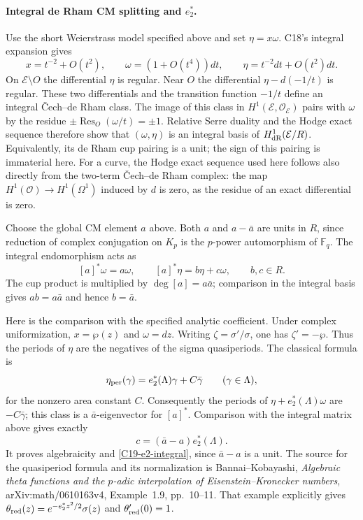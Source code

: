 \documentclass[11pt]{article}
\theoremstyle{definition}\newtheorem{definition}[theorem]{Definition}\newtheorem{remark}[theorem]{Remark}
\begin{document}
\paragraph{Integral de Rham CM splitting and $e_2^*$.}
Use the short Weierstrass model specified above and set
$\eta=x\omega$.  C18's integral expansion gives
\[
 x=t^{-2}+O(t^2),\qquad
 \omega=(1+O(t^4))dt,\qquad
 \eta=t^{-2}dt+O(t^2)dt.
\]
On $\mathcal E\setminus O$ the differential $\eta$ is regular.
Near $O$ the differential $\eta-d(-1/t)$ is regular.  These
two differentials and the transition function $-1/t$ define
an integral \v Cech--de Rham class.  The image of this class
in $H^1(\mathcal E,\mathcal O_{\mathcal E})$ pairs with
$\omega$ by the residue $\pm\operatorname{Res}_O(\omega/t)
=\pm1$.  Relative Serre duality and the Hodge exact sequence
therefore show that $(\omega,\eta)$ is an integral basis of
$H^1_{\rm dR}(\mathcal E/R)$.  Equivalently, its de Rham cup
pairing is a unit; the sign of this pairing is immaterial here.
For a curve, the Hodge exact sequence used here follows also
directly from the two-term \v Cech--de Rham complex: the map
$H^1(\mathcal O)\to H^1(\Omega^1)$ induced by $d$ is zero,
as the residue of an exact differential is zero.

Choose the global CM element $a$ above.  Both $a$ and
$a-\bar a$ are units in $R$, since reduction of complex
conjugation on $K_p$ is the $p$-power automorphism of
$\mathbb F_q$.  The integral endomorphism acts as
\[
 [a]^*\omega=a\omega,
 \qquad [a]^*\eta=b\eta+c\omega,
 \qquad b,c\in R.
\]
The cup product is multiplied by $\deg[a]=a\bar a$;
comparison in the integral basis gives $ab=a\bar a$ and
hence $b=\bar a$.

Here is the comparison with the specified analytic coefficient.
Under complex uniformization, $x=\wp(z)$ and $\omega=dz$.
Writing $\zeta=\sigma'/\sigma$, one has
$\zeta'=-\wp$.  Thus the periods of $\eta$ are the negatives
of the sigma quasiperiods.  The classical formula is
\[
 \eta_{\rm per}(\gamma)
    =e_2^*(\Lambda)\gamma+C\bar\gamma
       \qquad(\gamma\in\Lambda),
\]
for the nonzero area constant $C$.
Consequently the periods of
$\eta+e_2^*(\Lambda)\omega$ are $-C\bar\gamma$;
this class is a $\bar a$-eigenvector for $[a]^*$.
Comparison with the integral matrix above gives exactly
\[
 c=(\bar a-a)e_2^*(\Lambda).
\]
It proves algebraicity and \eqref{C19-e2-integral}, since
$\bar a-a$ is a unit.  The source for the quasiperiod formula
and its normalization is Bannai--Kobayashi,
\emph{Algebraic theta functions and the $p$-adic interpolation
of Eisenstein--Kronecker numbers}, arXiv:math/0610163v4,
Example~1.9, pp.~10--11.  That example explicitly gives
$\theta_{\rm red}(z)=e^{-e_2^*z^2/2}\sigma(z)$ and
$\theta_{\rm red}'(0)=1$.
\end{document}
